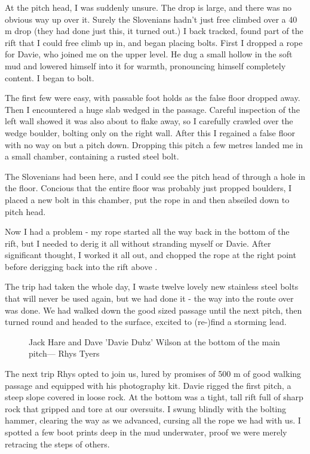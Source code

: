 At the pitch head, I was suddenly unsure. The drop is large, and there was no obvious way up over it. Surely the Slovenians hadn’t just free climbed over a 40 m drop (they had done just this, it turned out.) I back tracked, found part of the rift that I could free climb up in, and began placing bolts. First I dropped a rope for Davie, who joined me on the upper level. He dug a small hollow in the soft mud and lowered himself into it for warmth, pronouncing himself completely content. I began to bolt.

The first few were easy, with passable foot holds as the false floor dropped away. Then I encountered a huge slab wedged in the passage. Careful inspection of the left wall showed it was also about to flake away, so I carefully crawled over the wedge boulder, bolting only on the right wall. After this I regained a false floor with no way on but a pitch down. Dropping this pitch a few metres landed me in a small chamber, containing a rusted steel bolt.

The Slovenians had been here, and I could see the pitch head of  through a hole in the floor. Concious that the entire floor was probably just propped boulders, I placed a new bolt in this chamber, put the rope in and then abseiled down to  pitch head.

Now I had a problem - my rope started all the way back in the bottom of the rift, but I needed to derig it all without stranding myself or Davie. After significant thought, I worked it all out, and chopped the rope at the right point before derigging back into the rift above . 

The trip had taken the whole day, I waste twelve lovely new stainless steel bolts that will never be used again, but we had done it - the way into the route over  was done. We had walked down the good sized passage until the next pitch, then turned round and headed to the surface, excited to (re-)find a storming lead.

\begin{figure}[t!]
\checkoddpage \ifoddpage \forcerectofloat \else \forceversofloat \fi
\centering
{}
\caption{Jack Hare and Dave 'Davie Dubz' Wilson at the bottom of the \protect{} main pitch--- Rhys Tyers}
\label{Elec dreams main pitch}
\end{figure}

The next trip Rhys opted to join us, lured by promises of 500 m of good walking passage and equipped with his photography kit. Davie rigged the first pitch, a steep slope covered in loose rock. At the bottom was a tight, tall rift full of sharp rock that gripped and tore at our oversuits. I swung blindly with the bolting hammer, clearing the way as we advanced, cursing all the rope we had with us. I spotted a few boot prints deep in the mud underwater, proof we were merely retracing the steps of others.

